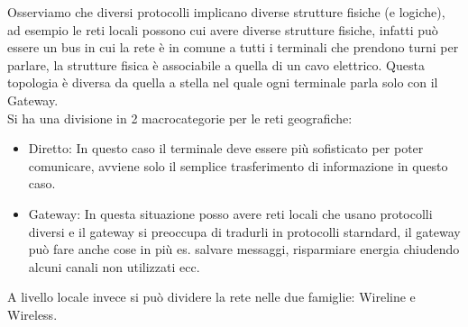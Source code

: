 \documentclass[11pt, twocolumn]{article}
\newenvironment{myitemize}
{ \begin{itemize}[topsep=0ex]
		\setlength{\itemsep}{0pt}
		\setlength{\parskip}{0pt}
		\setlength{\parsep}{0pt}     }
	{ \end{itemize}                  }
\begin{document}
Osserviamo che diversi protocolli implicano diverse strutture fisiche (e logiche), ad esempio le reti locali possono  cui avere diverse strutture fisiche, infatti può essere un bus in cui la rete è in comune a tutti i terminali che prendono turni per parlare, la strutture fisica è associabile a quella di un cavo elettrico.
Questa topologia è diversa da quella a stella nel quale ogni terminale parla solo con il Gateway.\\
Si ha una divisione in 2 macrocategorie per le reti geografiche:
\begin{myitemize}
  \item Diretto: In questo caso il terminale deve essere più sofisticato per poter comunicare, avviene solo il semplice trasferimento di informazione in questo caso.
  \item Gateway: In questa situazione posso avere reti locali che usano protocolli diversi e il gateway si preoccupa di tradurli in protocolli starndard, il gateway può fare anche cose in più es. salvare messaggi, risparmiare energia chiudendo alcuni canali non utilizzati ecc. 
\end{myitemize}
A livello locale invece si può dividere la rete nelle due famiglie: Wireline e Wireless.
\end{document}
